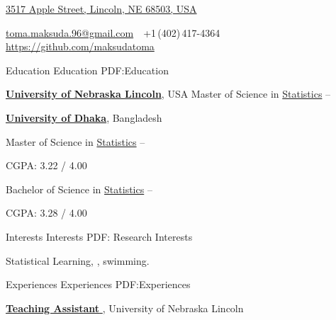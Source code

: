 \documentclass[letterpaper,MMMyyyy,nonstopmode]{simpleresumecv}
\newcommand{\CVAuthor}{Maksuda Aktar Toma}
\newcommand{\CVWebpage}{https://github.com/maksudatoma}
\begin{document}

\Title{\CVAuthor}

\begin{SubTitle}
\href{https://www.google.com/maps/place/17+Prime+Avenue,+Springfield,+Pennsylvania+10111,+USA}
{3517 Apple Street, Lincoln, NE 68503, USA}
\par
\href{mailto:johndoe@example.com}
{toma.maksuda.96@gmail.com}
\,\SubBulletSymbol\,
+1\,(402)\,417-4364
\,\SubBulletSymbol\,
\href{\CVWebpage}
{\url{\CVWebpage}}
\end{SubTitle}

\begin{Body}


\Section
{Education}
{Education}
{PDF:Education}

\Entry
\href{http://www.example.com/my-university}
{\textbf{University of Nebraska Lincoln}},
  USA
\Gap
\BulletItem
Master of Science in
\href{http://www.example.com/my-department}
{Statistics}
\hfill
{} --

\Gap
\Entry
\href{http://www.example.com/my-college}
{\textbf{University of Dhaka}},
Bangladesh         

\Gap
\BulletItem
Master of Science in
\href{http://www.example.com/my-department}
{Statistics}
\hfill
{} --

\SubBulletItem
CGPA: 3.22 / 4.00

\Gap
\BulletItem
Bachelor of Science in
\href{http://www.example.com/my-department}
{Statistics}
\hfill
{} --
\begin{Detail}
\SubBulletItem
CGPA: 3.28 / 4.00
\end{Detail}


\Section
{Interests}
{Interests}
{PDF: Research Interests}

\Entry
Statistical Learning,
,
swimming.


\Section
{ Experiences}
{ Experiences}
{PDF:Experiences}

\Entry
\href{http://www.example.com/my-institute}
{\textbf{Teaching Assistant }},
University of Nebraska Lincoln


\end{Body}
\end{document}
